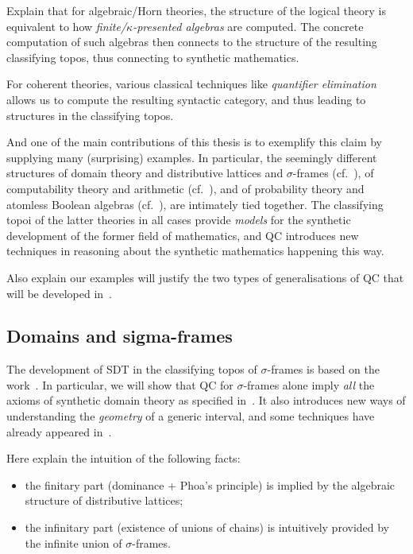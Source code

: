 Explain that for algebraic/Horn theories, the structure of the logical theory is equivalent to how \emph{finite/$\kappa$-presented algebras} are computed. The concrete computation of such algebras then connects to the structure of the resulting classifying topos, thus connecting to synthetic mathematics.

For coherent theories, various classical techniques like \emph{quantifier elimination} allows us to compute the resulting syntactic category, and thus leading to structures in the classifying topos.

And one of the main contributions of this thesis is to exemplify this claim by supplying many (surprising) examples. In particular, the seemingly different structures of domain theory and distributive lattices and $\sigma$-frames (cf.~), of computability theory and arithmetic (cf.~), and of probability theory and atomless Boolean algebras (cf.~), are intimately tied together. The classifying topoi of the latter theories in all cases provide \emph{models} for the synthetic development of the former field of mathematics, and \gls{QC} introduces new techniques in reasoning about the synthetic mathematics happening this way.

Also explain our examples will justify the two types of generalisations of \gls{QC} that will be developed in~.

\subsection{Domains and sigma-frames}

The development of \gls{SDT} in the classifying topos of $\sigma$-frames is based on the work~\citet{sterling2025domains}. In particular, we will show that \gls{QC} for $\sigma$-frames alone imply \emph{all} the axioms of synthetic domain theory as specified in~\citet{hyland_first_2006}. It also introduces new ways of understanding the \emph{geometry} of a generic interval, and some techniques have already appeared in~\citet{bakke2026synthetic}. 

Here explain the intuition of the following facts: 
\begin{itemize}
  \item the finitary part (dominance + Phoa's principle) is implied by the algebraic structure of distributive lattices;
  \item the infinitary part (existence of unions of chains) is intuitively provided by the infinite union of $\sigma$-frames.
\end{itemize}
 
